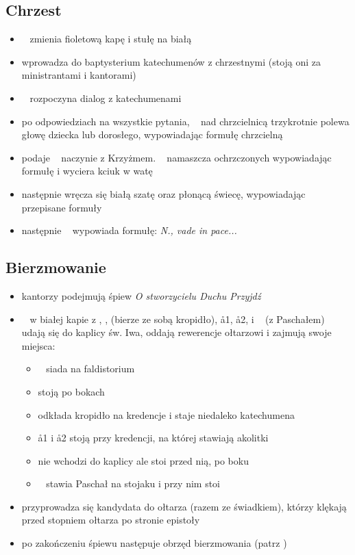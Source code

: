 \subsection{Chrzest}
\begin{itemize}
	\item \ii~ zmienia {\color{violet} fioletową} kapę i stułę na białą
	\item {} wprowadza do baptysterium katechumenów z chrzestnymi (stoją oni
	      za ministrantami i kantorami)
	\item \ii~ rozpoczyna dialog z katechumenami
	\item po odpowiedziach na wszystkie pytania, \ii~ nad chrzcielnicą
	      trzykrotnie polewa głowę dziecka lub dorosłego, wypowiadając formułę
	      chrzcielną
	\item {} podaje \ii~ naczynie z Krzyżmem. \ii~ namaszcza ochrzczonych
	      wypowiadając formułę i wyciera kciuk w watę
	\item następnie wręcza się białą szatę oraz płonącą świecę, wypowiadając
	      przepisane formuły
	\item następnie \ii~ wypowiada formułę: \textit{N., vade in pace...}
\end{itemize}
\subsection{Bierzmowanie}
\begin{itemize}
	\item kantorzy podejmują śpiew \textit{O stworzycielu Duchu Przyjdź}
	\item \ii~ w białej kapie z , ,  (bierze ze sobą kropidło),
	      \aa1, \aa2,  i \paschal~ (z Paschałem) udają się do kaplicy
	      św. Iwa, oddają rewerencje ołtarzowi i zajmują swoje miejsca:
	      \begin{itemize}
		      \item \ii~ siada na faldistorium
		      \item {} stoją po bokach \ii~
		      \item {} odkłada kropidło na kredencje i staje niedaleko
		            katechumena
		      \item \aa1 i \aa2 stoją przy kredencji, na której stawiają
		            akolitki
		      \item {} nie wchodzi do kaplicy ale stoi przed nią, po boku
		      \item \paschal~ stawia Paschał na stojaku i przy nim stoi
	      \end{itemize}
	\item przyprowadza się kandydata do ołtarza (razem ze świadkiem), którzy
	      klękają przed stopniem ołtarza po stronie epistoły
	\item po zakończeniu śpiewu następuje obrzęd bierzmowania (patrz
	      \textit{})
\end{itemize}

